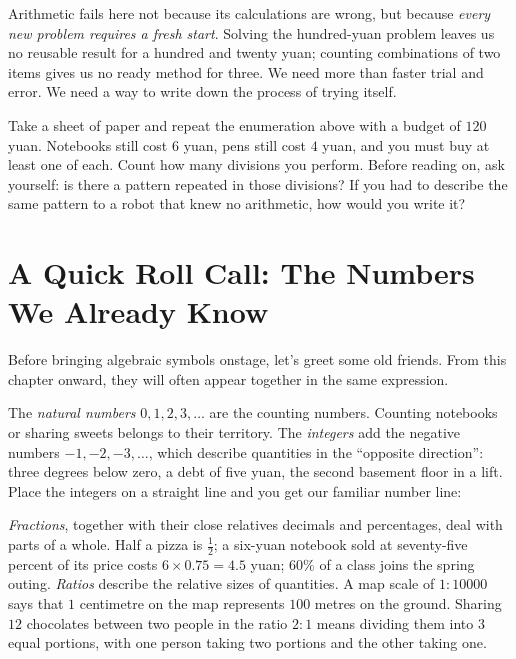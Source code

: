 Arithmetic fails here not because its calculations are wrong, but because \emph{every new problem requires a fresh start}. Solving the hundred-yuan problem leaves us no reusable result for a hundred and twenty yuan; counting combinations of two items gives us no ready method for three. We need more than faster trial and error. We need a way to write down the process of trying itself.

\begin{shiyan}
Take a sheet of paper and repeat the enumeration above with a budget of $120$ yuan. Notebooks still cost $6$ yuan, pens still cost $4$ yuan, and you must buy at least one of each. Count how many divisions you perform. Before reading on, ask yourself: is there a pattern repeated in those divisions? If you had to describe the same pattern to a robot that knew no arithmetic, how would you write it?
\end{shiyan}

\section{A Quick Roll Call: The Numbers We Already Know}

Before bringing algebraic symbols onstage, let's greet some old friends. From this chapter onward, they will often appear together in the same expression.

The \emph{natural numbers} $0,1,2,3,\dots$ are the counting numbers. Counting notebooks or sharing sweets belongs to their territory. The \emph{integers} add the negative numbers $-1,-2,-3,\dots$, which describe quantities in the ``opposite direction'': three degrees below zero, a debt of five yuan, the second basement floor in a lift. Place the integers on a straight line and you get our familiar number line:

\begin{center}
\end{center}

\emph{Fractions}, together with their close relatives decimals and percentages, deal with parts of a whole. Half a pizza is $\frac{1}{2}$; a six-yuan notebook sold at seventy-five percent of its price costs $6\times 0.75=4.5$ yuan; $60\%$ of a class joins the spring outing. \emph{Ratios} describe the relative sizes of quantities. A map scale of $1:10000$ says that $1$ centimetre on the map represents $100$ metres on the ground. Sharing $12$ chocolates between two people in the ratio $2:1$ means dividing them into $3$ equal portions, with one person taking two portions and the other taking one.

